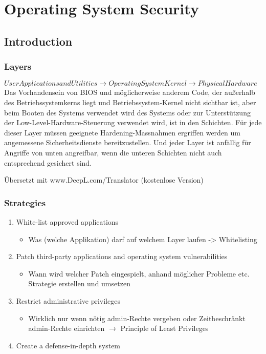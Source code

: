 

\section{Operating System Security}

\subsection{Introduction}

\subsubsection{Layers}
$User Applications and Utilities \rightarrow Operating System Kernel \rightarrow Physical Hardware$\\

Das Vorhandensein von BIOS und möglicherweise anderem Code, der außerhalb des Betriebssystemkerns liegt und Betriebssystem-Kernel nicht sichtbar ist, aber beim Booten des Systems verwendet wird des Systems oder zur Unterstützung der Low-Level-Hardware-Steuerung verwendet wird, ist in den Schichten.
Für jede dieser Layer müssen geeignete Hardening-Massnahmen ergriffen werden um angemessene Sicherheitsdienste bereitzustellen. Und jeder Layer ist anfällig für Angriffe von unten angreifbar, wenn die unteren Schichten nicht auch entsprechend gesichert sind.

Übersetzt mit www.DeepL.com/Translator (kostenlose Version)

\subsubsection{Strategies}
\begin{enumerate}
    \item White-list approved applications
    \begin{itemize}
        \item Was (welche Applikation) darf auf welchem Layer laufen -> Whitelisting
    \end{itemize}
    \item Patch third-party applications and operating system vulnerabilities
    \begin{itemize}
        \item Wann wird welcher Patch eingespielt, anhand möglicher Probleme etc. Strategie erstellen und umsetzen
    \end{itemize}
    \item Restrict administrative privileges
    \begin{itemize}
        \item Wirklich nur wenn nötig admin-Rechte vergeben oder Zeitbeschränkt admin-Rechte einrichten $\rightarrow$ Principle of Least Privileges
    \end{itemize}
    \item Create a defense-in-depth system
\end{enumerate}

